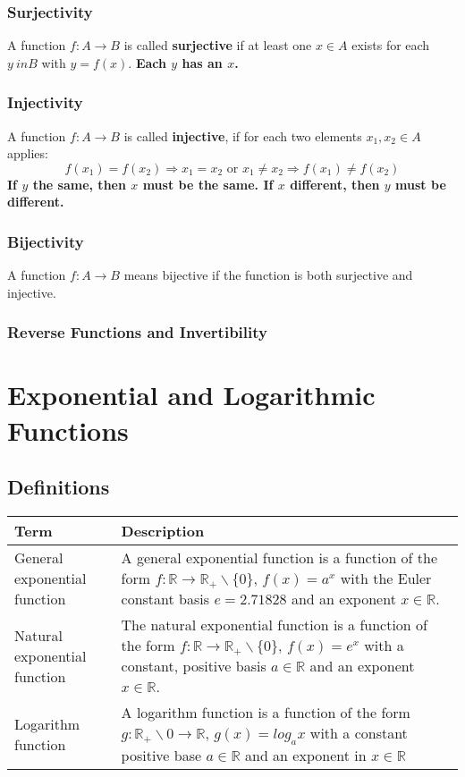 \documentclass{book}
\begin{document}
\subsubsection{Surjectivity}
A function $f: A \to B$ is called \textbf{surjective} if at least one $x \in A$ exists for each $y \ in B$ with $y = f(x)$.
\textbf{Each $y$ has an $x$.}

\subsubsection{Injectivity}
A function $f: A \to B$ is called \textbf{injective}, if for each two elements $x_1, x_2 \in A$ applies:
\[
  f(x_1) = f(x_2) \Rightarrow x_1 = x_2 \text{ or } x_1 \ne x_2 \Rightarrow f(x_1) \ne f(x_2)
\]
\textbf{If $y$ the same, then $x$ must be the same. If $x$ different, then $y$ must be different.}

\subsubsection{Bijectivity}
A function $f: A \to B$ means bijective if the function is both surjective and injective.

\subsubsection{Reverse Functions and Invertibility}


\section{Exponential and Logarithmic Functions}
\subsection{Definitions}
\begin{tabular}{p{3cm}p{10.5cm}}
  \toprule
  \textbf{Term} & \textbf{Description} \\
  \midrule
  General exponential function & A general exponential function is a function of the form $f:\mathbb{R} \to \mathbb{R_+}\backslash \{0\}, \, f(x)=a^x$ with the Euler constant basis $e=2.71828$ and an exponent $x \in \mathbb{R}$.\\
  \midrule
  Natural exponential function & The natural exponential function is a function of the form $f:\mathbb{R} \to \mathbb{R_+}\backslash \{0\}, \, f(x)=e^x$ with a constant, positive basis $a \in \mathbb{R}$ and an exponent $x \in \mathbb{R}$.\\
  \midrule
  Logarithm function & A logarithm function is a function of the form $g: \mathbb{R_+} \backslash{0} \to \mathbb{R}, \, g(x)=log_{a}x$ with a constant positive base $a \in \mathbb{R}$ and an exponent in $x \in \mathbb{R}$\\
  \bottomrule
\end{tabular}
\end{document}

